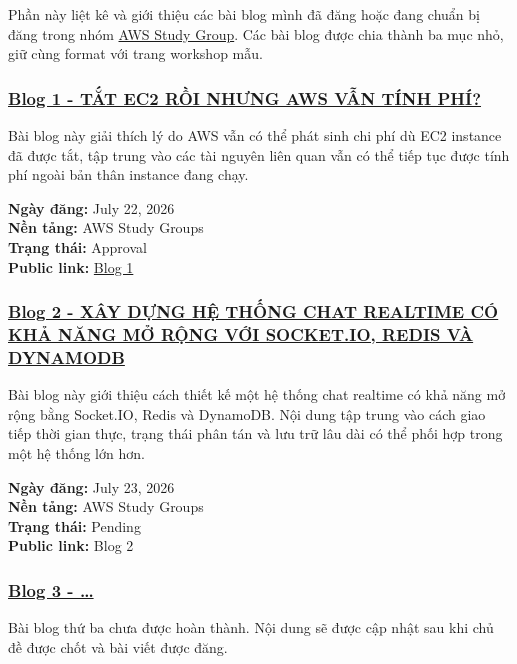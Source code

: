 Phần này liệt kê và giới thiệu các bài blog mình đã đăng hoặc đang chuẩn
bị đăng trong nhóm
\href{https://www.facebook.com/groups/awsstudygroupfcj}{AWS Study
Group}. Các bài blog được chia thành ba mục nhỏ, giữ cùng format với
trang workshop mẫu.

\subsubsection{\texorpdfstring{\href{3.1-Blog1/}{Blog 1 - TẮT EC2 RỒI
NHƯNG AWS VẪN TÍNH
PHÍ?}}{Blog 1 - TẮT EC2 RỒI NHƯNG AWS VẪN TÍNH PHÍ?}}

Bài blog này giải thích lý do AWS vẫn có thể phát sinh chi phí dù EC2
instance đã được tắt, tập trung vào các tài nguyên liên quan vẫn có thể
tiếp tục được tính phí ngoài bản thân instance đang chạy.

\textbf{Ngày đăng:} July 22, 2026\\
\textbf{Nền tảng:} AWS Study Groups\\
\textbf{Trạng thái:} Approval\\
\textbf{Public link:}
\href{https://www.facebook.com/groups/awsstudygroupfcj/permalink/2219932025438424/?rdid=SGRgenG5JS3UR6Y0\#}{Blog
1}

\subsubsection{\texorpdfstring{\href{3.2-Blog2/}{Blog 2 - XÂY DỰNG HỆ
THỐNG CHAT REALTIME CÓ KHẢ NĂNG MỞ RỘNG VỚI SOCKET.IO, REDIS VÀ
DYNAMODB}}{Blog 2 - XÂY DỰNG HỆ THỐNG CHAT REALTIME CÓ KHẢ NĂNG MỞ RỘNG VỚI SOCKET.IO, REDIS VÀ DYNAMODB}}

Bài blog này giới thiệu cách thiết kế một hệ thống chat realtime có khả
năng mở rộng bằng Socket.IO, Redis và DynamoDB. Nội dung tập trung vào
cách giao tiếp thời gian thực, trạng thái phân tán và lưu trữ lâu dài có
thể phối hợp trong một hệ thống lớn hơn.

\textbf{Ngày đăng:} July 23, 2026\\
\textbf{Nền tảng:} AWS Study Groups\\
\textbf{Trạng thái:} Pending\\
\textbf{Public link:} Blog 2

\subsubsection{\texorpdfstring{\href{3.3-Blog3/}{Blog 3 -
\ldots{}}}{Blog 3 - \ldots{}}}

Bài blog thứ ba chưa được hoàn thành. Nội dung sẽ được cập nhật sau khi
chủ đề được chốt và bài viết được đăng.
